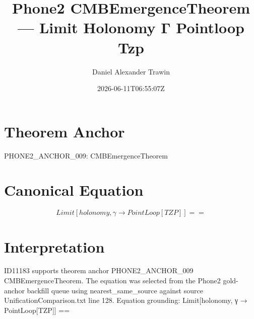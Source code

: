 \documentclass[11pt]{article}
\title{Phone2 CMBEmergenceTheorem — Limit Holonomy Γ Pointloop Tzp}
\author{Daniel Alexander Trawin}
\date{2026-06-11T06:55:07Z}
\begin{document}
\maketitle
\section*{Theorem Anchor}
PHONE2_ANCHOR_009: CMBEmergenceTheorem
\section*{Canonical Equation}
\[
Limit[holonomy, γ → PointLoop[TZP]] ==
\]
\section*{Interpretation}
ID11183 supports theorem anchor PHONE2_ANCHOR_009 CMBEmergenceTheorem. The equation was selected from the Phone2 gold-anchor backfill queue using nearest_same_source against source UnificationComparison.txt line 128. Equation grounding: Limit[holonomy, γ → PointLoop[TZP]] ==
\end{document}
